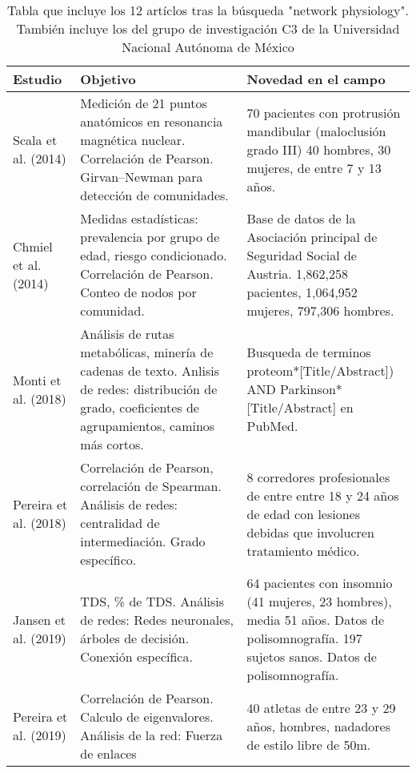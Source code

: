 \documentclass[twoside,twocolumn]{article}
\begin{document}
\begin{center}
  \begin{longtable}{|p{}p{}p{}|}
    \caption{Tabla que incluye los 12 artíclos tras la búsqueda "network physiology". También incluye los del grupo de investigación C3 de la Universidad Nacional Autónoma de México}\\
    \hline
    \textbf{Estudio} & \textbf{Objetivo} & \textbf{Novedad en el campo} \\
    \hline
    Scala et al. (2014) \cite{scala2014complex}&
    Medición de 21 puntos anatómicos en resonancia magnética nuclear.
    Correlación de Pearson.
    Girvan–Newman para detección de comunidades.
    &
    70 pacientes con protrusión mandibular (maloclusión grado III) 40 hombres, 30 mujeres, de entre 7 y 13 años.
    \\\hline
    Chmiel et al. (2014) \cite{chmiel2014spreading} &
    Medidas estadísticas: prevalencia por grupo de edad, riesgo condicionado.
    Correlación de Pearson.
    Conteo de nodos por comunidad.
    &
    Base de datos de la Asociación principal de Seguridad Social de Austria. 1,862,258 pacientes, 1,064,952 mujeres, 797,306 hombres.
    \\\hline
    Monti et al. (2018) \cite{monti2018network} &
    Análisis de rutas metabólicas, minería de cadenas de texto.
    Anlisis de redes: distribución de grado, coeficientes de agrupamientos, caminos más cortos.
    &
    Busqueda de terminos proteom*[Title/Abstract]) AND Parkinson* [Title/Abstract] en PubMed.
    \\\hline
    Pereira et al. (2018) \cite{pereira2018computational} &
    Correlación de Pearson, correlación de Spearman.
    Análisis de redes: centralidad de intermediación. Grado específico.
    &
    8 corredores profesionales de entre entre 18 y 24 años de edad con lesiones debidas que involucren tratamiento médico.
    \\\hline
    Jansen et al. (2019) \cite{jansen2019network} &
    TDS, \% de TDS.
    Análisis de redes: Redes neuronales, árboles de decisión. Conexión específica.
    &
    64 pacientes con insomnio (41 mujeres, 23 hombres), media 51 años. Datos de polisomnografía.
    197 sujetos sanos. Datos de polisomnografía.
    \\\hline
    Pereira et al. (2019) \cite{pereira2019complex} &
    Correlación de Pearson.
    Calculo de eigenvalores.
    Análisis de la red: Fuerza de enlaces
    &
    40 atletas de entre 23 y 29 años, hombres, nadadores de estilo libre de 50m.

\end{longtable}
\end{center}
\end{document}
